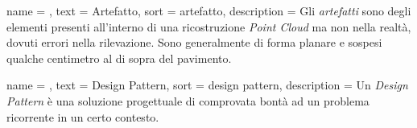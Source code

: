  {
	name = ,
	text = Artefatto,
	sort = artefatto,
	description = {Gli \emph{artefatti} sono degli elementi presenti all'interno di una ricostruzione \emph{Point Cloud} ma non nella realtà, dovuti errori nella rilevazione. Sono generalmente di forma planare e sospesi qualche centimetro al di sopra del pavimento.}
}

 {
	name = ,
	text = Design Pattern,
	sort = design pattern,
	description = {Un \emph{Design Pattern} è una soluzione progettuale di comprovata bontà ad un problema ricorrente in un certo contesto.}
}

%
%
%
%
